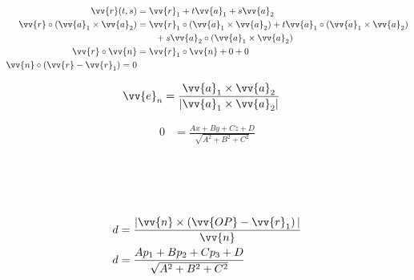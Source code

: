 \begin{boxleft}
\end{boxleft}\begin{boxrightshaded}
\begin{align} 

\vv{r}(t,s) &=\vv{r}_1+t\vv{a}_1+s\vv{a}_2\\
\vv{r}\circ(\vv{a}_1\times\vv{a}_2)&=\vv{r}_1\circ(\vv{a}_1\times\vv{a}_2)+t\vv{a}_1\circ(\vv{a}_1\times\vv{a}_2)\\
&\qquad +s\vv{a}_2\circ(\vv{a}_1\times\vv{a}_2)\\
\vv{r}\circ\vv{n}&=\vv{r}_1\circ\vv{n}+0+0\\
\vv{n}\circ\left(\vv{r}-\vv{r}_1\right)=0
\end{align}\end{boxrightshaded}

\begin{boxleft}
\end{boxleft}\begin{boxrightshaded}
\begin{align} 
\vv{e}_n&=\frac{\vv{a}_1\times\vv{a}_2}{|\vv{a}_1\times\vv{a}_2|}
\end{align}\end{boxrightshaded}

\begin{boxleft}
\end{boxleft}\begin{boxrightshaded}
\begin{align} 
0&=\frac{Ax+By+Cz+D}{\sqrt{A^2+B^2+C^2}}
\end{align}\end{boxrightshaded}


\begin{boxleft}
\\
\\
\\
\end{boxleft}\begin{boxrightshaded}
\begin{align} 
d&=\frac{|\vv{n}\times\left(\vv{OP}-\vv{r}_1\right)|}{\vv{n}}\\
d&=\frac{Ap_1+Bp_2+Cp_3+D}{\sqrt{A^2+B^2+C^2}}
\end{align}\end{boxrightshaded}


